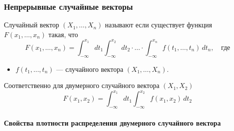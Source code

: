 \subsubsection{Непрерывные случайные векторы}

\begin{definition}
	Случайный вектор $(X_1, \dots, X_n)$ называют  если существует функция $F(x_1, \dots, x_n)$ такая, что
	\[
		F(x_1, \dots, x_n) = \int_{-\infty}^{x_1} dt_1 \int_{-\infty}^{x_2} dt_2 \cdot \ldots \cdot \int_{-\infty}^{x_n} f(t_1, \dots, t_n)\,dt_n, \quad \text{где} 
	\]
	\begin{itemize}
		\item $f(t_1, \dots, t_n)$ ---  случайного вектора $(X_1, \dots, X_n)$.
	\end{itemize}
\end{definition}
\begin{rem}
	Соответственно для двумерного случайного вектора $(X_1, X_2)$
	\[
		F(x_1, x_2) = \int_{-\infty}^{x_1}dt_1\int_{-\infty}^{x_2}f(x_1, x_2)\,dt_2
	\]
\end{rem}

\paragraph{Свойства плотности распределения двумерного случайного вектора}

